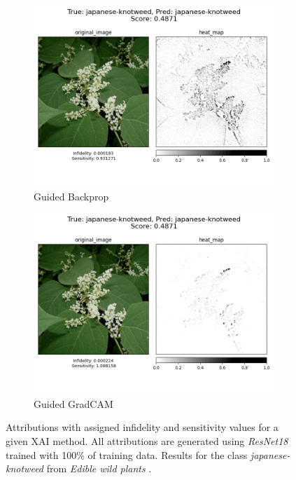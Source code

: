 \begin{figure}[h]
  \centering
 \begin{subfigure}{.45\textwidth}
    \centering
    \includegraphics[width=\textwidth]{results/metrics/96-gbp.png}
    \caption{Guided Backprop}\label{fig:resnet-inf-96-gbp}
\end{subfigure}
 \begin{subfigure}{.45\textwidth}
    \centering
    \includegraphics[width=\textwidth]{results/metrics/96-gradcam.png}
    \caption{Guided GradCAM}\label{fig:resnet-inf-96-gradcam}
\end{subfigure}

 \caption{Attributions with assigned infidelity and sensitivity values for a given XAI method. All attributions are generated using \textit{ResNet18} trained with 100\% of training data. Results for the class \textit{japanese-knotweed} from \textit{Edible wild plants} \cite{edible-wild-plants}.}\label{fig:resnet-inf-96}
\end{figure}

